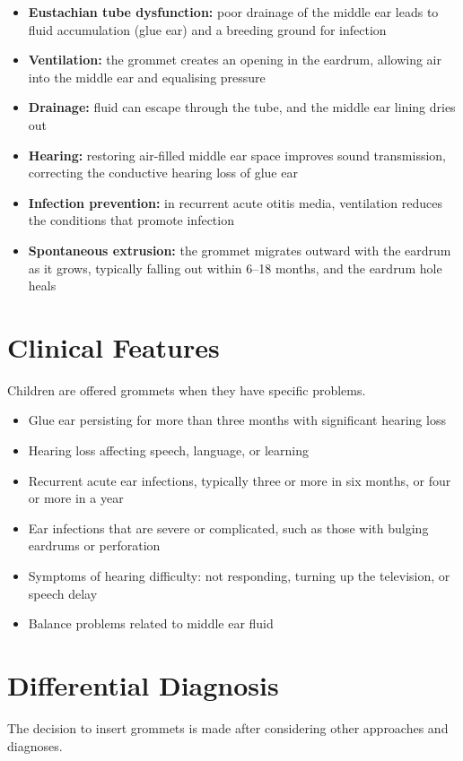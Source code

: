 \begin{itemize}
    \item \textbf{Eustachian tube dysfunction:} poor drainage of the middle ear leads to fluid accumulation (glue ear) and a breeding ground for infection
    \item \textbf{Ventilation:} the grommet creates an opening in the eardrum, allowing air into the middle ear and equalising pressure
    \item \textbf{Drainage:} fluid can escape through the tube, and the middle ear lining dries out
    \item \textbf{Hearing:} restoring air-filled middle ear space improves sound transmission, correcting the conductive hearing loss of glue ear
    \item \textbf{Infection prevention:} in recurrent acute otitis media, ventilation reduces the conditions that promote infection
    \item \textbf{Spontaneous extrusion:} the grommet migrates outward with the eardrum as it grows, typically falling out within 6--18 months, and the eardrum hole heals
\end{itemize}

\section*{Clinical Features}
Children are offered grommets when they have specific problems.

\begin{itemize}
    \item Glue ear persisting for more than three months with significant hearing loss
    \item Hearing loss affecting speech, language, or learning
    \item Recurrent acute ear infections, typically three or more in six months, or four or more in a year
    \item Ear infections that are severe or complicated, such as those with bulging eardrums or perforation
    \item Symptoms of hearing difficulty: not responding, turning up the television, or speech delay
    \item Balance problems related to middle ear fluid
\end{itemize}

\section*{Differential Diagnosis}
The decision to insert grommets is made after considering other approaches and diagnoses.

